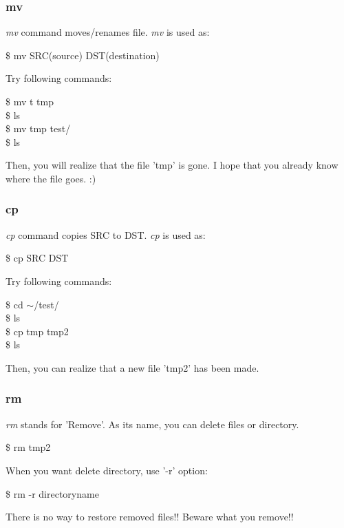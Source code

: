 \documentclass{beamer}
\begin{document}
	\begin{frame}
		\frametitle{mv}
		\textit{mv} command moves/renames file. \textit{mv} is used as:
		\begin{example}
			\$ mv SRC(source) DST(destination)
		\end{example}
		
		Try following commands: 
		\begin{example}
			\$ mv t tmp \\
			\$ ls \\
			\$ mv tmp test/ \\
			\$ ls
		\end{example}
	
		Then, you will realize that the file 'tmp' is gone. I hope that you already know where the file goes. :)
	\end{frame}

	\begin{frame}
		\frametitle{cp}
		\textit{cp} command copies SRC to DST. \textit{cp} is used as:
		\begin{example}
			\$ cp SRC DST
		\end{example}
	
		Try following commands:
		\begin{example}
			\$ cd $\sim$/test/ \\
			\$ ls \\
			\$ cp tmp tmp2 \\
			\$ ls
		\end{example}
		Then, you can realize that a new file 'tmp2' has been made. 
	\end{frame}

	\begin{frame}
		\frametitle{rm}
		\textit{rm} stands for 'Remove'. As its name, you can delete files or directory.
		\begin{example}
			\$ rm tmp2
		\end{example}
	
		When you want delete directory, use '-r' option:
		\begin{example}
			\$ rm -r directoryname
		\end{example}
	
		There is no way to restore removed files!! Beware what you remove!!
	\end{frame}
\end{document}
